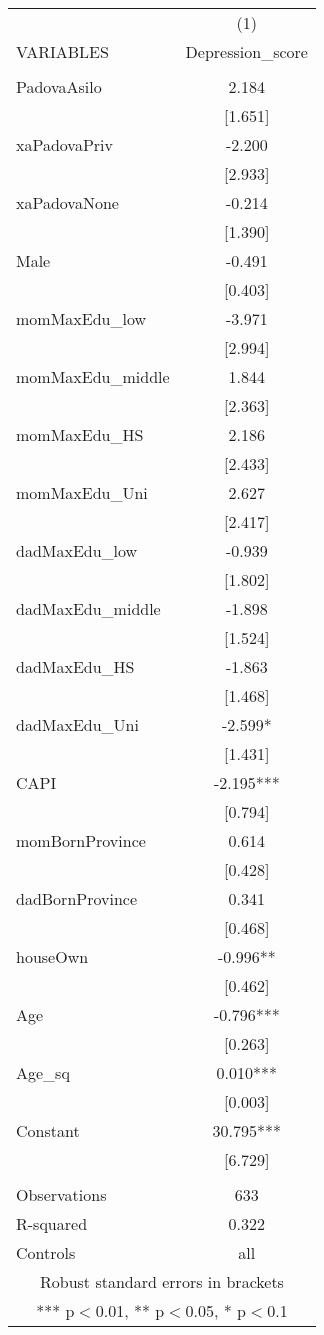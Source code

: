 \documentclass[]{article}
\begin{document}
\begin{tabular}{lc} \hline
 & (1) \\
VARIABLES & Depression\_score \\ \hline
 &  \\
PadovaAsilo & 2.184 \\
 & [1.651] \\
xaPadovaPriv & -2.200 \\
 & [2.933] \\
xaPadovaNone & -0.214 \\
 & [1.390] \\
Male & -0.491 \\
 & [0.403] \\
momMaxEdu\_low & -3.971 \\
 & [2.994] \\
momMaxEdu\_middle & 1.844 \\
 & [2.363] \\
momMaxEdu\_HS & 2.186 \\
 & [2.433] \\
momMaxEdu\_Uni & 2.627 \\
 & [2.417] \\
dadMaxEdu\_low & -0.939 \\
 & [1.802] \\
dadMaxEdu\_middle & -1.898 \\
 & [1.524] \\
dadMaxEdu\_HS & -1.863 \\
 & [1.468] \\
dadMaxEdu\_Uni & -2.599* \\
 & [1.431] \\
CAPI & -2.195*** \\
 & [0.794] \\
momBornProvince & 0.614 \\
 & [0.428] \\
dadBornProvince & 0.341 \\
 & [0.468] \\
houseOwn & -0.996** \\
 & [0.462] \\
Age & -0.796*** \\
 & [0.263] \\
Age\_sq & 0.010*** \\
 & [0.003] \\
Constant & 30.795*** \\
 & [6.729] \\
 &  \\
Observations & 633 \\
R-squared & 0.322 \\
 Controls & all \\ \hline
\multicolumn{2}{c}{ Robust standard errors in brackets} \\
\multicolumn{2}{c}{ *** p$<$0.01, ** p$<$0.05, * p$<$0.1} \\
\end{tabular}
\end{document}
